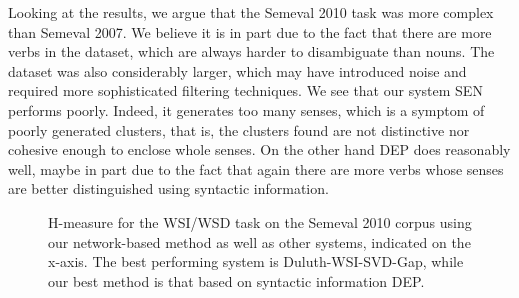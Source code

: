 Looking at the results, we argue that the Semeval 2010 task was more complex than Semeval 2007. We believe it is in part due to the fact that there are more verbs in the dataset, which are always harder to disambiguate than nouns. The dataset was also considerably larger, which may have introduced noise and required more sophisticated filtering techniques. We see that our system SEN performs poorly. Indeed, it generates too many senses, which is a symptom of poorly generated clusters, that is, the clusters found are not distinctive nor cohesive enough to enclose whole senses. On the other hand DEP does reasonably well, maybe in part due to the fact that again there are more verbs whose senses are better distinguished   using syntactic information.



\begin{figure}
\centering
{}
\caption{H-measure for the WSI/WSD task on the Semeval 2010 corpus using our network-based method as well as other systems, indicated on the x-axis. The best performing system is Duluth-WSI-SVD-Gap, while our best method is that based on syntactic information DEP.}
\label{fig:h_measure_semeval2010}
\end{figure}






